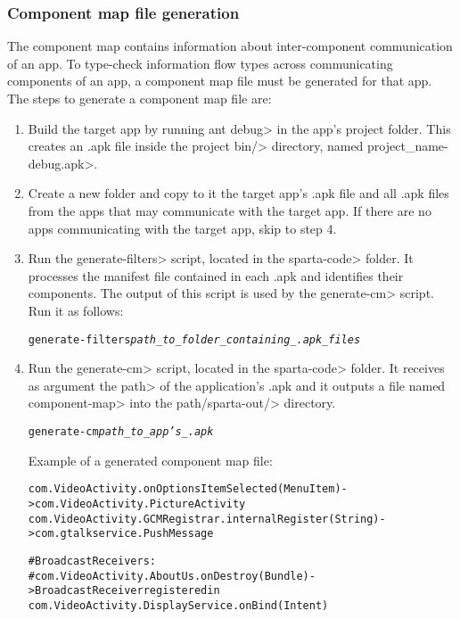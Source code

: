 \subsubsection{Component map file generation\label{component-map-generation}}
The component map contains information about inter-component communication of
an app. To type-check information flow types across communicating components of
an app, a component map file must be generated for that app. The steps to
generate a component map file are:

\begin{enumerate}

\item
Build the target app by running \<ant debug> in the app's project folder. This
creates an .apk file inside the project \<bin/> directory, named
\<project\_name-debug.apk>.

\item
Create a new folder and copy to it the target app's .apk file and all .apk files from
the apps that may communicate with the target app. If there are no apps
communicating with the target app, skip to step 4.

\item
Run the \<generate-filters> script, located in the \<sparta-code> folder. It
processes the manifest file contained in each .apk and identifies their
components. The output of this script is used by the \<generate-cm> script.
Run it as follows:
\begin{alltt}
    generate-filters   \textit{path\_to\_folder\_containing\_.apk\_files}
\end{alltt}

\item
Run the \<generate-cm> script, located in the \<sparta-code> folder. It
receives as argument the \<path> of the application's .apk and it outputs a file
named \<component-map> into the \<path/sparta-out/> directory.
\begin{alltt}
    generate-cm   \textit{path\_to\_app's\_.apk}
\end{alltt}

\bigskip

Example of a generated component map file:
\begin{alltt}
com.VideoActivity.onOptionsItemSelected(MenuItem) -> com.VideoActivity.PictureActivity
com.VideoActivity.GCMRegistrar.internalRegister(String) -> com.gtalkservice.PushMessage

#Broadcast Receivers:
#com.VideoActivity.AboutUs.onDestroy(Bundle) -> BroadcastReceiver registered in
                                com.VideoActivity.DisplayService.onBind(Intent)


\end{alltt}
\end{enumerate}
